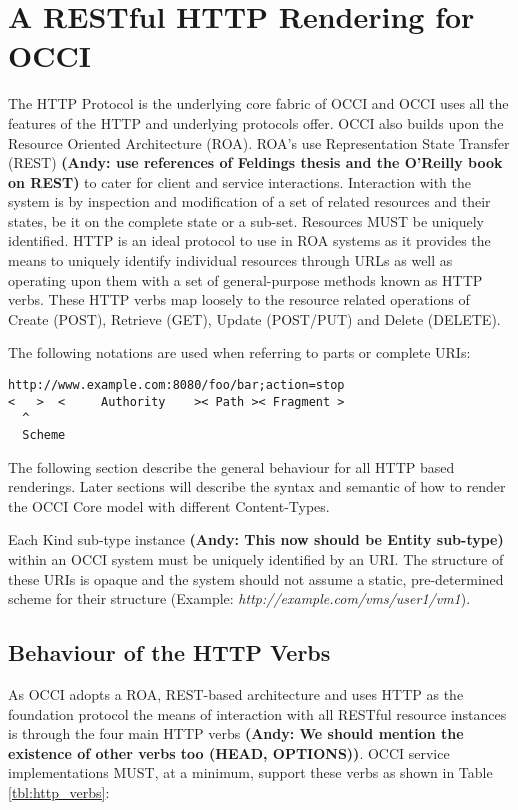 \documentclass[10pt,a4paper]{article}
\begin{document}
\section{A RESTful HTTP Rendering for OCCI}
The HTTP Protocol is the underlying core fabric of OCCI and OCCI uses all
the features of the HTTP and underlying protocols offer. 
OCCI also builds upon the Resource Oriented Architecture (ROA). 
ROA's use Representation State Transfer
(REST) \textbf{(Andy: use references of Feldings thesis and the O'Reilly book on REST)} 
to cater for client and service interactions. Interaction with
the system is by inspection and modification of a set of related
resources and their states, be it on the complete state or a
sub-set. Resources MUST be uniquely identified. HTTP is an ideal
protocol to use in ROA systems as it provides the means to uniquely
identify individual resources through URLs as well as operating upon
them with a set of general-purpose methods known as HTTP verbs. These HTTP verbs map
loosely to the resource related operations of Create (POST), Retrieve
(GET), Update (POST/PUT) and Delete (DELETE).

The following notations are used when referring to parts or complete
URIs:

\begin{verbatim}
http://www.example.com:8080/foo/bar;action=stop
<   >  <     Authority    >< Path >< Fragment >
  ^
  Scheme
\end{verbatim}

The following section describe the general behaviour for all HTTP based
renderings. Later sections will describe the syntax and semantic of
how to render the OCCI Core model with different Content-Types.

Each Kind sub-type instance \textbf{(Andy: This now should be Entity sub-type)} 
within an OCCI system must be uniquely
identified by an URI. The structure of these URIs is opaque and the
system should not assume a static, pre-determined scheme for their
structure (Example: \emph{http://example.com/vms/user1/vm1}).

\subsection{Behaviour of the HTTP Verbs}
As OCCI adopts a ROA, REST-based architecture and uses HTTP as the
foundation protocol the means of interaction with all RESTful resource
instances is through the four main HTTP verbs \textbf{(Andy: We should 
mention the existence of other verbs too (HEAD, OPTIONS))}. OCCI service
implementations MUST, at a minimum, support these verbs as shown in Table \ref{tbl:http_verbs}:
\end{document}

